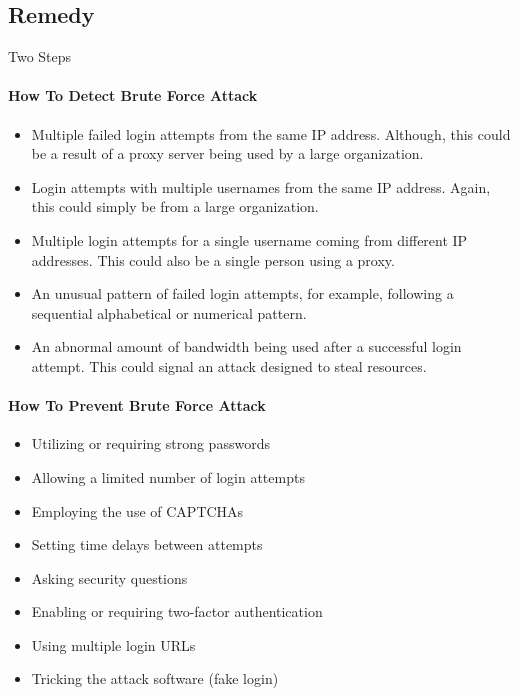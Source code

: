 \subsection{Remedy}
Two Steps

\paragraph{How To Detect Brute Force Attack}

\begin{itemize}
    \item Multiple failed login attempts from the same IP address. Although, this could be a result of a proxy server being used by a large organization.
    \item Login attempts with multiple usernames from the same IP address. Again, this could simply be from a large organization.
    \item Multiple login attempts for a single username coming from different IP addresses. This could also be a single person using a proxy.
    \item An unusual pattern of failed login attempts, for example, following a sequential alphabetical or numerical pattern.
    \item An abnormal amount of bandwidth being used after a successful login attempt. This could signal an attack designed to steal resources.
\end{itemize} 

\paragraph{How To Prevent Brute Force Attack}
    
\begin{itemize}
    \item Utilizing or requiring strong passwords
    \item Allowing a limited number of login attempts
    \item Employing the use of CAPTCHAs
    \item Setting time delays between attempts
    \item Asking security questions
    \item Enabling or requiring two-factor authentication
    \item Using multiple login URLs
    \item Tricking the attack software (fake login)
\end{itemize}
